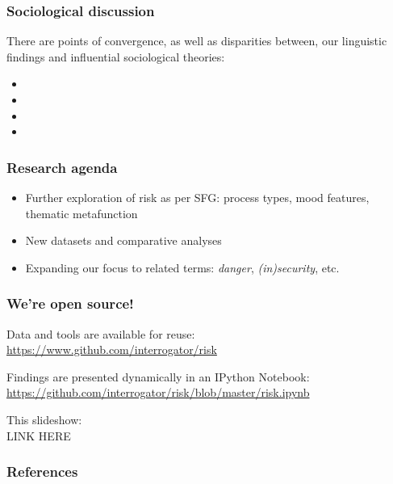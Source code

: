 \documentclass{beamer}       %
\begin{document}
\begin{frame}
    \frametitle{Sociological discussion}

    There are points of convergence, as well as disparities between, our linguistic findings and influential sociological theories:
    
    \begin{itemize}
    \item 
    \item 
    \item 
    \item 
    \end{itemize}

\end{frame}

\begin{frame}
    \frametitle{Research agenda}
    \begin{itemize}
        \item Further exploration of risk as per SFG: process types, mood features, thematic metafunction
        \item New datasets and comparative analyses
        \item Expanding our focus to related terms: \emph{danger}, \emph{(in)security}, etc.
    \end{itemize}
\end{frame}


\begin{frame}
    \frametitle{We're open source!}

    \noindent Data and tools are available for reuse: ~\\

    \noindent \url{https://www.github.com/interrogator/risk}

    \noindent Findings are presented dynamically in an IPython Notebook:  ~\\

    \noindent \url{https://github.com/interrogator/risk/blob/master/risk.ipynb}

    \noindent This slideshow: ~\\

    \noident LINK HERE

\end{frame}








    \begin{frame}[t,allowframebreaks]
    \frametitle{References}
    
    
    \end{frame}
    
    
\end{document}
